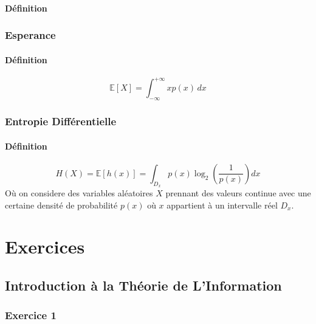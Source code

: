 \documentclass{article}
\begin{document}
\paragraph{Définition}

\subsubsection{Esperance}
\paragraph{Définition}
\begin{equation}\label{eq:esperance_continue}
    \boxed{
        \mathbb{E}[X] = \int_{-\infty}^{+\infty} x p(x)\,dx
    }
\end{equation}

\subsubsection{Entropie Différentielle}
\paragraph{Définition}
\begin{equation}\label{eq:entropie_differentielle}
    \boxed{
        H(X) = \mathbb{E}[h(x)] = \int_{D_x} p(x) \log_{2} \left( \frac{1}{p(x)} \right) dx
    }
\end{equation}
Où on considere des variables aléatoires $X$ prennant des valeurs continue avec une certaine densité de probabilité $p(x)$ où $x$ appartient à un intervalle réel $D_x$.


\section{Exercices}

\subsection{Introduction à la Théorie de L'Information}
\subsubsection{Exercice 1}
\end{document}
